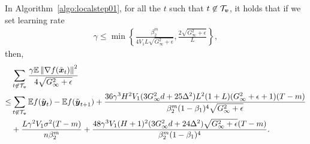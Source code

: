 \begin{lemma}
\label{lemma:local:reuse_step}
In Algorithm~\ref{algo:localstep01}, for all the $t$ such that $t\not\in\mathcal{T}_{\boldsymbol{v}}$, it holds that if we set learning rate
\begin{align*}
    \gamma \leq \min\left\{\frac{\beta_2^m}{4V_1L\sqrt{G_\infty^2+\epsilon}}, \frac{2\sqrt{G_\infty^2+\epsilon}}{L}\right\},
\end{align*}
then,
\begin{align*}
    & \sum_{t\not\in\mathcal{T}_{\boldsymbol{v}}}\frac{\gamma\mathbb E\left\| \nabla f(\tilde{\boldsymbol{x}}_t) \right\|^2}{4\sqrt{G_\infty^2+\epsilon}} \\
    \leq & \sum_{t\not\in\mathcal{T}_{\boldsymbol{v}}}\mathbb E f(\tilde{\boldsymbol{y}}_{t}) - \mathbb Ef(\tilde{\boldsymbol{y}}_{t+1}) + \frac{36\gamma^3H^2V_1(3G_\infty^2d+25\Delta^2)L^2(1+L)(G_\infty^2+\epsilon+1)(T-m)}{\beta_2^m(1-\beta_1)^4\sqrt{G_\infty^2+\epsilon}} \\
& + \frac{L\gamma^2V_1\sigma^2(T-m)}{n\beta_2^m} + \frac{48\gamma^3V_1(H+1)^2(3G_\infty^2d+24\Delta^2)\sqrt{G_\infty^2+\epsilon}(T-m)}{\beta_2^m(1-\beta_1)^4}.
\end{align*}
\end{lemma}
